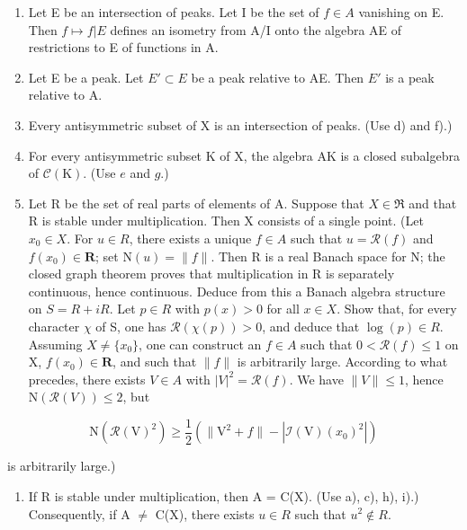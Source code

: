 \begin{enumerate}
\def\labelenumi{\alph{enumi})}
\setcounter{enumi}{4}
\item
  Let E be an intersection of peaks. Let I be the set of \(f \in A\) vanishing on E. Then \(f \mapsto f|E\) defines an isometry from A/I onto the algebra A\textbar E of restrictions to E of functions in A.
\item
  Let E be a peak. Let \(E' \subset E\) be a peak relative to A\textbar E. Then \(E'\) is a peak relative to A.
\item
  Every antisymmetric subset of X is an intersection of peaks. (Use d) and f).)
\item
  For every antisymmetric subset K of X, the algebra A\textbar K is a closed subalgebra of \(\mathcal{C}(\mathrm{K})\). (Use \(e\) and \(g\).)
\item
  Let R be the set of real parts of elements of A. Suppose that \(X \in \mathfrak{R}\) and that R is stable under multiplication. Then X consists of a single point. (Let \(x_{0} \in X\). For \(u \in R\), there exists a unique \(f \in A\) such that \(u = \mathcal{R}(f)\) and \(f(x_{0}) \in \mathbf{R}\); set \(\mathrm{N}(u) = \|f\|\). Then R is a real Banach space for N; the closed graph theorem proves that multiplication in R is separately continuous, hence continuous. Deduce from this a Banach algebra structure on \(S = R + iR\). Let \(p \in R\) with \(p(x) > 0\) for all \(x \in X\). Show that, for every character \(\chi\) of S, one has \(\mathcal{R}(\chi(p)) > 0\), and deduce that \(\log(p) \in R\). Assuming \(X \neq \{x_{0}\}\), one can construct an \(f \in A\) such that \(0 < \mathcal{R}(f) \leqslant 1\) on X, \(f(x_{0}) \in \mathbf{R}\), and such that \(\|f\|\) is arbitrarily large. According to what precedes, there exists \(V \in A\) with \(|V|^{2} = \mathcal{R}(f)\). We have \(\|V\| \leqslant 1\), hence \(\mathrm{N}(\mathcal{R}(V)) \leqslant 2\), but
\end{enumerate}

\[
\mathrm{N} (\mathcal {R} (\mathrm{V}) ^ {2}) \geqslant \frac {1}{2} \left(\| \mathrm{V} ^ {2} + f \| - | \mathcal {I} (\mathrm{V}) (x _ {0}) ^ {2} |\right)
\]

is arbitrarily large.)

\begin{enumerate}
\def\labelenumi{\alph{enumi})}
\setcounter{enumi}{9}
\tightlist
\item
  If R is stable under multiplication, then A = C(X). (Use a), c), h), i).) Consequently, if A \(\neq\) C(X), there exists \(u \in R\) such that \(u^{2} \notin R\).
\end{enumerate}

